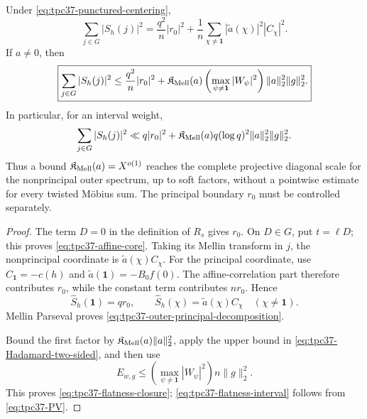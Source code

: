 \begin{theorem}
\label{thm:tpc37-Mellin-flatness-sufficient}
Under \eqref{eq:tpc37-punctured-centering},
\begin{equation}
 \boxed{
 \sum_{j\in G}|S_h(j)|^2
 =\frac{q^2}{n}|r_0|^2
 +\frac1n\sum_{\chi\ne\mathbf1}
  |\widetilde a(\chi)|^2|C_\chi|^2.}
 \label{eq:tpc37-outer-principal-decomposition}
\end{equation}
If \(a\ne0\), then
\begin{equation}
 \boxed{
 \sum_{j\in G}|S_h(j)|^2
 \le\frac{q^2}{n}|r_0|^2
 +\mathfrak K_{\rm Mell}(a)
 \left(\max_{\psi\ne\mathbf1}|W_\psi|^2\right)
 \|a\|_2^2\|g\|_2^2.}
 \label{eq:tpc37-flatness-closure}
\end{equation}
In particular, for an interval weight,
\begin{equation}
 \sum_{j\in G}|S_h(j)|^2
 \ll q|r_0|^2
 +\mathfrak K_{\rm Mell}(a)
 q(\log q)^2\|a\|_2^2\|g\|_2^2.
 \label{eq:tpc37-flatness-interval}
\end{equation}
Thus a bound
\(\mathfrak K_{\rm Mell}(a)=X^{o(1)}\) reaches the complete projective
diagonal scale for the nonprincipal outer spectrum, up to soft factors,
without a pointwise estimate for every twisted M\"obius sum.  The
principal boundary \(r_0\) must be controlled separately.
\end{theorem}

\begin{proof}
The term \(D=0\) in the definition of \(R_s\) gives \(r_0\).  On
\(D\in G\), put \(t=\ell D\); this proves
\eqref{eq:tpc37-affine-core}.  Taking its Mellin transform in \(j\), the
nonprincipal coordinate is
\(\widetilde a(\chi)C_\chi\).  For the principal coordinate, use
\(C_{\mathbf1}=-c(h)\) and
\(\widetilde a(\mathbf1)=-B_0f(0)\).  The affine-correlation part
therefore contributes \(r_0\), while the constant term contributes
\(nr_0\).  Hence
\[
 \widehat S_h(\mathbf1)=qr_0,
 \qquad
 \widehat S_h(\chi)=\widetilde a(\chi)C_\chi
 \quad(\chi\ne\mathbf1).
\]
Mellin Parseval proves
\eqref{eq:tpc37-outer-principal-decomposition}.

Bound the first factor by
\(\mathfrak K_{\rm Mell}(a)\|a\|_2^2\), apply the upper bound in
\eqref{eq:tpc37-Hadamard-two-sided}, and then use
\[
 E_{w,g}
 \le\left(\max_{\psi\ne\mathbf1}|W_\psi|^2\right)
 n\|g\|_2^2.
\]
This proves \eqref{eq:tpc37-flatness-closure};
\eqref{eq:tpc37-flatness-interval} follows from
\eqref{eq:tpc37-PV}.
\end{proof}

